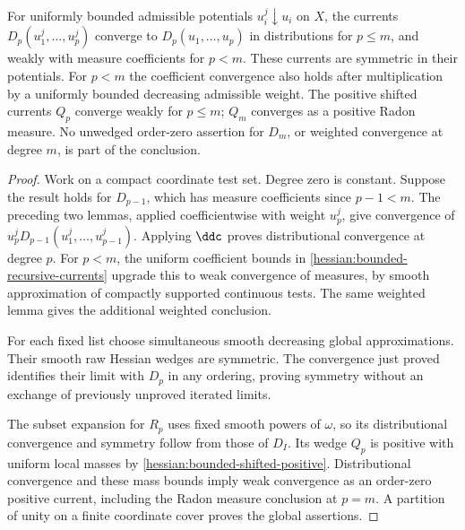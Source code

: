 \begin{theorem}\label{draft621:joint-decreasing-products}
For uniformly bounded admissible potentials $u_i^j\downarrow u_i$
on $X$, the currents $D_p(u_1^j,\ldots,u_p^j)$ converge to
$D_p(u_1,\ldots,u_p)$ in distributions for $p\leq m$, and weakly
with measure coefficients for $p<m$. These currents are symmetric
in their potentials. For $p<m$ the coefficient convergence also
holds after multiplication by a uniformly bounded decreasing
admissible weight. The positive shifted currents $Q_p$ converge
weakly for $p\leq m$; $Q_m$ converges as a positive Radon measure.
No unwedged order-zero assertion for $D_m$, or weighted convergence
at degree $m$, is part of the conclusion.
\end{theorem}
\begin{proof}
Work on a compact coordinate test set. Degree zero is constant.
Suppose the result holds for $D_{p-1}$, which has measure
coefficients since $p-1<m$. The preceding two lemmas, applied
coefficientwise with weight $u_p^j$, give convergence of
$u_p^jD_{p-1}(u_1^j,\ldots,u_{p-1}^j)$. Applying $\ddc$ proves
distributional convergence at degree $p$. For $p<m$, the uniform
coefficient bounds in \cref{hessian:bounded-recursive-currents}
upgrade this to weak convergence of measures, by smooth
approximation of compactly supported continuous tests. The same
weighted lemma gives the additional weighted conclusion.

For each fixed list choose simultaneous smooth decreasing global
approximations. Their smooth raw Hessian wedges are symmetric.
The convergence just proved identifies their limit with $D_p$
in any ordering, proving symmetry without an exchange of
previously unproved iterated limits.

The subset expansion for $R_p$ uses fixed smooth powers of
$\omega$, so its distributional convergence and symmetry follow
from those of $D_I$. Its wedge $Q_p$ is positive with uniform
local masses by \cref{hessian:bounded-shifted-positive}.
Distributional convergence and these mass bounds imply weak
convergence as an order-zero positive current, including the
Radon measure conclusion at $p=m$. A partition of unity on a
finite coordinate cover proves the global assertions.
\end{proof}
